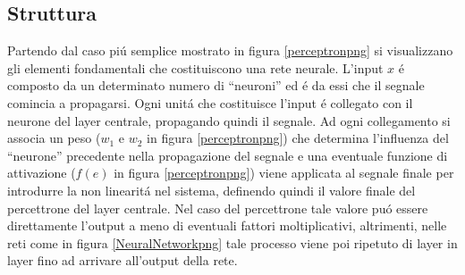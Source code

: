 \documentclass[a4paper,10pt]{article}
\begin{document}
 \subsection{Struttura} 
 Partendo dal caso pi\'u semplice mostrato in figura \ref{perceptronpng} si visualizzano gli elementi fondamentali che costituiscono una rete neurale. 
 L'input $x$ \'e composto da un determinato numero di ``neuroni'' ed \'e da essi che il segnale comincia a propagarsi. Ogni unit\'a che costituisce l'input \'e collegato con il neurone del layer centrale, propagando quindi il segnale. Ad ogni collegamento si associa un peso ($w_1$ e $w_2$ in figura \ref{perceptronpng}) che determina l'influenza del ``neurone'' precedente nella propagazione del segnale e una eventuale funzione di attivazione ($f(e)$ in figura \ref{perceptronpng}) viene applicata al segnale finale per introdurre la non linearit\'a nel sistema, definendo quindi il valore finale del percettrone del layer centrale. Nel caso del percettrone tale valore pu\'o essere direttamente l'output a meno di eventuali fattori moltiplicativi, altrimenti, nelle reti come in figura \ref{NeuralNetworkpng} tale processo viene poi ripetuto di layer in layer fino ad arrivare all'output della rete.
  
\end{document}
